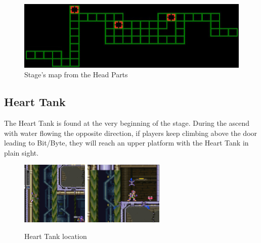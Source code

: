 \begin{figure}[htp]
	\centering
	\includegraphics[width=.7\linewidth]{figures/X3/Toxic_seahorse/Map.jpg}
	\caption{Stage's map from the Head Parts}
	\label{fig:Giant_dam_map}
\end{figure}

\subsection{Heart Tank}
The Heart Tank is found at the very beginning of the stage. During the ascend with water flowing the opposite direction, if players keep climbing above the door leading to Bit/Byte, they will reach an upper platform with the Heart Tank in plain sight.

\begin{figure}[htp]
	\centering
	\includegraphics[height=3cm]{figures/X3/Toxic_seahorse/hear_1.jpg}
	\includegraphics[height=3cm]{figures/X3/Toxic_seahorse/hear_2.jpg}
	\caption{Heart Tank location}
\end{figure}

